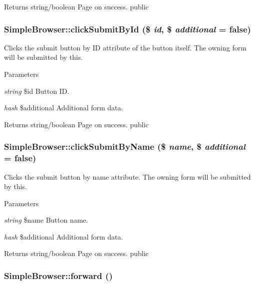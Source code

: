 \begin{DoxyReturn}{Returns}
string/boolean Page on success.  public 
\end{DoxyReturn}
\hypertarget{class_simple_browser_a76bd5346e06f7102a25709c704f85a5c}{
\subsubsection[{clickSubmitById}]{\setlength{\rightskip}{0pt plus 5cm}SimpleBrowser::clickSubmitById (\$ {\em id}, \/  \$ {\em additional} = {\ttfamily false})}}
\label{class_simple_browser_a76bd5346e06f7102a25709c704f85a5c}
Clicks the submit button by ID attribute of the button itself. The owning form will be submitted by this. 
\begin{DoxyParams}{Parameters}
\item[{\em string}]\$id Button ID. \item[{\em hash}]\$additional Additional form data. \end{DoxyParams}
\begin{DoxyReturn}{Returns}
string/boolean Page on success.  public 
\end{DoxyReturn}
\hypertarget{class_simple_browser_a0cd6ae8dcdcd8239a7823759549bb494}{
\subsubsection[{clickSubmitByName}]{\setlength{\rightskip}{0pt plus 5cm}SimpleBrowser::clickSubmitByName (\$ {\em name}, \/  \$ {\em additional} = {\ttfamily false})}}
\label{class_simple_browser_a0cd6ae8dcdcd8239a7823759549bb494}
Clicks the submit button by name attribute. The owning form will be submitted by this. 
\begin{DoxyParams}{Parameters}
\item[{\em string}]\$name Button name. \item[{\em hash}]\$additional Additional form data. \end{DoxyParams}
\begin{DoxyReturn}{Returns}
string/boolean Page on success.  public 
\end{DoxyReturn}
\hypertarget{class_simple_browser_afa6e04c5baef77dd916a61c8f69c1ab2}{
\subsubsection[{forward}]{\setlength{\rightskip}{0pt plus 5cm}SimpleBrowser::forward ()}}
